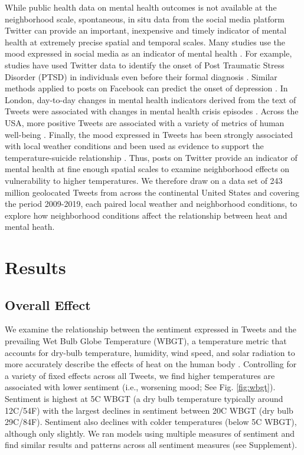 \documentclass[fleqn,10pt]{wlscirep}
\begin{document}
While public health data on mental health outcomes is not available at the neighborhood scale, spontaneous, in situ data from the social media platform Twitter can provide an important, inexpensive and timely indicator of mental health at extremely precise spatial and temporal scales. Many studies use the mood expressed in social media as an indicator of mental health \cite{Edo-Osagie2020Jul, Sinnenberg2016Dec}. For example, studies have used Twitter data to identify the onset of Post Traumatic Stress Disorder (PTSD) in individuals even before their formal diagnosis \cite{Reece2017Oct}. Similar methods applied to posts on Facebook can predict the onset of depression \cite{Eichstaedt2018Oct}. In London, day-to-day changes in mental health indicators derived from the text of Tweets were associated with changes in mental health crisis episodes \cite{Kolliakou2020Feb}. Across the USA, more positive Tweets are associated with a variety of metrics of human well-being \cite{Mitchell2013May}. Finally, the mood expressed in Tweets has been strongly associated with local weather conditions \cite{baylis_weather_2018, hannak_tweetin_2012} and been used as evidence to support the temperature-suicide relationship \cite{Burke2018Aug}. Thus, posts on Twitter provide an indicator of mental health at fine enough spatial scales to examine neighborhood effects on vulnerability to higher temperatures. We therefore draw on a data set of 243 million geolocated Tweets from across the continental United States and covering the period 2009-2019, each paired local weather and neighborhood conditions, to explore how neighborhood conditions affect the relationship between heat and mental heath.

\section*{Results}

\subsection*{Overall Effect}
We examine the relationship between the sentiment expressed in Tweets and the prevailing Wet Bulb Globe Temperature (WBGT), a temperature metric that accounts for dry-bulb temperature, humidity, wind speed, and solar radiation to more accurately describe the effects of heat on the human body \cite{budd2008wet}. Controlling for a variety of fixed effects across all Tweets, we find higher temperatures are associated with lower sentiment (i.e., worsening mood; See Fig. \ref{fig:wbgt}).  Sentiment is highest at 5\textdegree C WBGT (a dry bulb temperature typically around 12\textdegree C/54\textdegree F) with the largest declines in sentiment between 20\textdegree C WBGT (dry bulb 29\textdegree C/84\textdegree F). Sentiment also declines with colder temperatures (below 5\textdegree C WBGT), although only slightly. We ran models using multiple measures of sentiment and find similar results and patterns across all sentiment measures (see Supplement).
\end{document}
